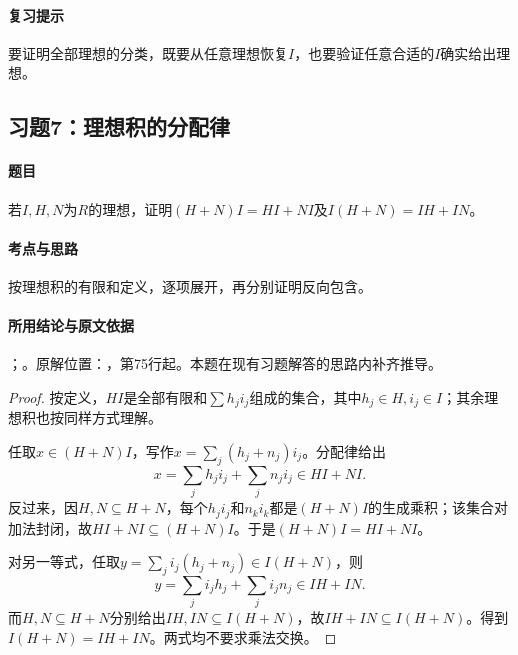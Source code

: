 \paragraph{复习提示}

要证明全部理想的分类，既要从任意理想恢复$I$，也要验证任意合适的$I$确实给出理想。



\subsection{习题7：理想积的分配律}

\label{ex:3:7}

\paragraph{题目}

若$I,H,N$为$R$的理想，证明$(H+N)I=HI+NI$及$I(H+N)=IH+IN$。

\paragraph{考点与思路}

按理想积的有限和定义，逐项展开，再分别证明反向包含。

\paragraph{所用结论与原文依据}

；。原解位置：，第75行起。本题在现有习题解答的思路内补齐推导。


\begin{proof}

按定义，$HI$是全部有限和$\sum h_ji_j$组成的集合，其中$h_j\in H,i_j\in I$；其余理想积也按同样方式理解。

任取$x\in(H+N)I$，写作$x=\sum_j(h_j+n_j)i_j$。分配律给出
\[
x=\sum_jh_ji_j+\sum_jn_ji_j\in HI+NI.
\]
反过来，因$H,N\subseteq H+N$，每个$h_ji_j$和$n_ki_k$都是$(H+N)I$的生成乘积；该集合对加法封闭，故$HI+NI\subseteq(H+N)I$。于是$(H+N)I=HI+NI$。

对另一等式，任取$y=\sum_ji_j(h_j+n_j)\in I(H+N)$，则
\[
y=\sum_ji_jh_j+\sum_ji_jn_j\in IH+IN.
\]
而$H,N\subseteq H+N$分别给出$IH,IN\subseteq I(H+N)$，故$IH+IN\subseteq I(H+N)$。得到$I(H+N)=IH+IN$。两式均不要求乘法交换。

\end{proof}

